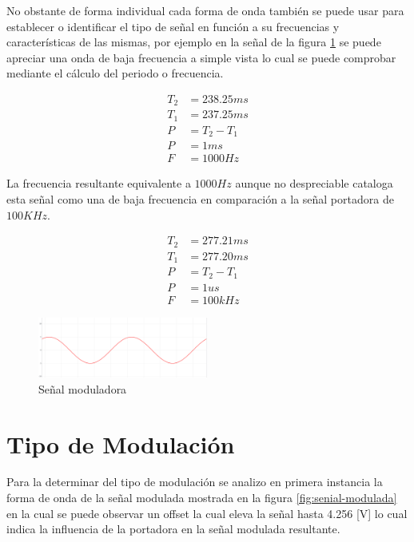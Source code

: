 \documentclass[conference]{IEEEtran}
\begin{document}
	No obstante de forma individual cada forma de onda también se puede usar para establecer o identificar el tipo de señal en función a su frecuencias y características de las mismas, por ejemplo en la señal de la figura \ref{fig:senial-moduladora} se puede apreciar una onda de baja frecuencia a simple vista lo cual se puede comprobar mediante el cálculo del periodo o frecuencia.
	
	\begin{align*}
		T_2 &= 238.25ms\\ 
		T_1 &= 237.25ms \\
		P  &= T_2 - T_1 \\
		P &= 1ms\\
		F &= 1000 Hz
	\end{align*}
	
	La frecuencia resultante equivalente a $1000 Hz$ aunque no despreciable cataloga esta señal como una de baja frecuencia en comparación a la señal portadora de $100K Hz$.
	
	\begin{align*}
		T_2 &= 277.21ms\\ 
		T_1 &= 277.20ms \\
		P  &= T_2 - T_1 \\
		P &= 1us\\
		F &= 100k Hz
	\end{align*}
	
	\begin{figure}[h]
		\centering
		\includegraphics[width=0.5\textwidth]{media/senial-moduladora}
		\caption{Señal moduladora}
		\label{fig:senial-moduladora}
	\end{figure}
	
	
	\section{Tipo de Modulación}
	
	Para la determinar del tipo de modulación se analizo en primera instancia la forma de onda de la señal modulada mostrada en la figura \ref{fig:senial-modulada} en la cual se puede observar un offset la cual eleva la señal hasta 4.256 [V] lo cual indica la influencia de la portadora en la señal modulada resultante.
	
\end{document}
